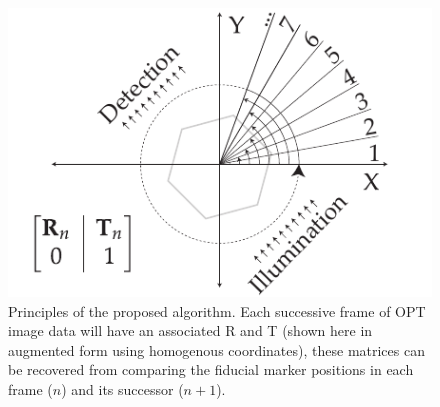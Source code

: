 \begin{figure}
  \centering
  \includegraphics{./figures/flOPT_principle}
  \caption[Principles of the proposed algorithm]{Principles of the proposed algorithm. Each successive frame of \gls{OPT} image data will have an associated \gls{R} and \gls{T} (shown here in augmented form using homogenous coordinates), these matrices can be recovered from comparing the fiducial marker positions in each frame (\(n\)) and its successor (\(n+1\)).}
\end{figure}




